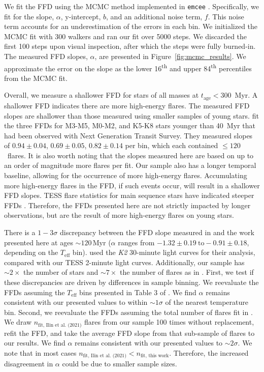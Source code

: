 \documentclass[twocolumn, linenumbers]{aastex631}
\begin{document}
We fit the FFD using the MCMC method implemented in \texttt{emcee} \citep{goodman10, emcee}.
Specifically, we fit for the slope, $\alpha$, y-intercept, $b$, and an additional
noise term, $f$. This noise term  accounts for an underestimation of the errors in
each bin. We initialized the MCMC fit with 300 walkers and ran our fit over 5000
steps.  We discarded the first 100 steps upon visual inspection, after which the
steps were fully burned-in. The measured FFD slopes, $\alpha$, are presented in
Figure~\ref{fig:mcmc_results}. We approximate the error on the slope as the lower
16\textsuperscript{th} and upper 84\textsuperscript{th} percentiles from the MCMC fit.

Overall, we measure a shallower FFD for stars of all masses at $t_\textrm{age} < 300$~Myr.
A shallower FFD indicates there are more high-energy flares. The measured FFD slopes
are shallower than those measured using smaller samples of young stars. \cite{jackman21}
fit the three FFDs for M3-M5, M0-M2, and K5-K8 stars younger than 40~Myr that had been
observed with Next Generation Transit Survey. They measured slopes of $0.94 \pm 0.04$,
$0.69 \pm 0.05$, $0.82 \pm 0.14$ per bin, which each contained $\leq 120$~flares.
It is also worth noting that the slopes measured here are based on up to an order of
magnitude more flares per fit. Our sample also has a longer temporal baseline,
allowing for the occurrence of more high-energy flares. Accumulating more high-energy
flares in the FFD, if such events occur, will result in a shallower FFD slopes. TESS
flare statistics for main sequence stars have indicated steeper FFDs \citep{feinstein22_criticality}.
Therefore, the FFDs presented here are not strictly impacted by longer observations,
but are the result of more high-energy flares on young stars.


There is a $1-3\sigma$ discrepancy between the FFD slope measured in \cite{ilin21}
and the work presented here at ages $\sim 120$\,Myr ($\alpha$ ranges from
$-1.32 \pm 0.19 ~\textrm{to} -0.91 \pm 0.18$, depending on the $T_\textrm{eff}$ bin).
\cite{ilin21} used the \textit{K2} 30-minute light curves for their analysis, compared
with our TESS 2-minute light curves. Additionally, our sample has $\sim 2 \times$
the number of stars and $\sim 7 \times$ the number of flares as in \cite{ilin21}.
First, we test if these discrepancies are driven by differences in sample binning.
We reevaluate the FFDs assuming the $T_\textrm{eff}$ bins presented in Table 3 of
\cite{ilin21}. We find $\alpha$ remains consistent with our presented values to
within $\sim 1\sigma$ of the nearest temperature bin. Second, we reevaluate the
FFDs assuming the total number of flares fit in \cite{ilin21}. We draw
$n_\textrm{fit, Ilin et al. (2021)}$ \citep[last column in Table 3 of ][]{ilin21}
flares from our sample 100 times without replacement, refit the FFD, and take
the average FFD slope from that sub-sample of flares to our results.  We find
$\alpha$ remains consistent with our presented values to $\sim 2\sigma$. We note
that in most cases $n_\textrm{fit, Ilin et al. (2021)} < n_\textrm{fit, this work}$.
Therefore, the increased disagreement in $\alpha$ could be due to smaller sample sizes.
\end{document}
